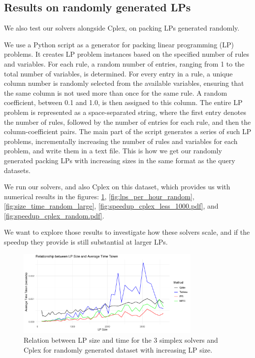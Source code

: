 \subsection{Results on randomly generated LPs}
We also test our solvers alongside Cplex, on packing LPs generated randomly.

We use a Python script as a generator for packing linear programming (LP) problems.
It creates LP problem instances
based on the specified number of rules and variables.
For each rule, a random number of entries, ranging from 1 to
the total number of variables, is determined.
For every entry in a rule, a unique column number is randomly selected from
the available variables, ensuring that the same column is not used more than once for
the same rule. A random coefficient, between 0.1 and 1.0, is then assigned to
this column. The entire LP problem is represented as a space-separated string,
where the first entry denotes the number of rules, followed by the number of
entries for each rule, and then the column-coefficient pairs.
The main part of
the script generates a series of such LP problems, incrementally increasing the
number of rules and variables for each problem, and write them in a text file.
This is how we get our randomly generated packing LPs with increasing sizes in the same format
as the query datasets.

We run our solvers, and also Cplex on this dataset, which provides us with numerical results
in the figures: \ref{fig:time_vs_size_random}, \ref{fig:lps_per_hour_random}, \ref{fig:size_time_random_large},
\ref{fig:speedup_cplex_less_1000.pdf}, and \ref{fig:speedup_cplex_random.pdf}.

We want to
explore those results to investigate how these solvers scale, and if the speedup
they provide is still substantial at larger LPs.


\begin{figure}[!htb]
    \centering
    \includegraphics[width=0.8\textwidth]{figures/time_vs_size_random.pdf}
    \caption{Relation between LP size and time for the 3 simplex solvers and Cplex for randomly generated
        dataset with increasing LP size.}
    \label{fig:time_vs_size_random}
\end{figure}


